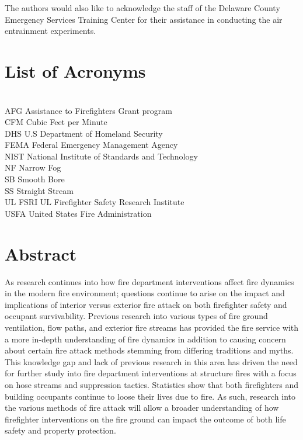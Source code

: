 \documentclass[12pt,oneside]{book}
\begin{document}
The authors would also like to acknowledge the staff of the Delaware County Emergency Services Training Center for their assistance in conducting the air entrainment experiments.

\cleardoublepage
{}
{}
\tableofcontents

\cleardoublepage
{}
{}
\listoffigures

\cleardoublepage
{}
{}
\listoftables

\chapter{List of Acronyms}

\begin{tabbing}
\hspace{1.5in} \= \\
AFG \> Assistance to Firefighters Grant program  \\
CFM \> Cubic Feet per Minute \\
DHS \> U.S Department of Homeland Security   \\   
FEMA \> Federal Emergency Management Agency  \\
NIST \> National Institute of Standards and Technology \\
NF \> Narrow Fog \\
SB \> Smooth Bore \\
SS \> Straight Stream \\
UL FSRI \> UL Firefighter Safety Research Institute \\
USFA \> United States Fire Administration  \\
\end{tabbing}

\newpage

\mainmatter

\chapter*{\centering Abstract}
As research continues into how fire department interventions affect fire dynamics in the modern fire environment; questions continue to arise on the impact and implications of interior versus exterior fire attack on both firefighter safety and occupant survivability. Previous research into various types of fire ground ventilation, flow paths, and exterior fire streams has provided the fire service with a more in-depth understanding of fire dynamics in addition to causing concern about certain fire attack methods stemming from differing traditions and myths. This knowledge gap and lack of previous research in this area has driven the need for further study into fire department interventions at structure fires with a focus on hose streams and suppression tactics. Statistics show that both firefighters and building occupants continue to loose their lives due to fire. As such, research into the various methods of fire attack will allow a broader understanding of how firefighter interventions on the fire ground can impact the outcome of both life safety and property protection. 
\end{document}
